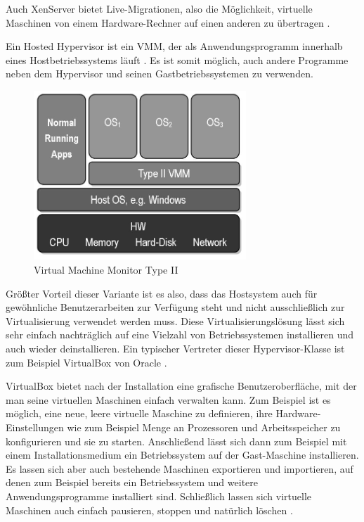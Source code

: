 Auch XenServer bietet Live-Migrationen, also die Möglichkeit, virtuelle Maschinen von einem Hardware-Rechner auf einen anderen zu übertragen \citep[Vgl.][]{xen:002}.


Ein Hosted Hypervisor ist ein \ac{VMM}, der als Anwendungsprogramm innerhalb eines Hostbetriebssystems läuft \citep[Vgl.][S. 22 ff.]{Goldberg73}. Es ist somit möglich, auch andere Programme neben dem Hypervisor und seinen Gastbetriebssystemen zu verwenden.

\begin{figure}[!ht]
  \begin{center}
    \includegraphics[width=8cm]{bilder/VMM-Type2.jpg}
    \caption{Virtual Machine Monitor Type II \citep{wiki:003}}
  \end{center}
\end{figure}

Größter Vorteil dieser Variante ist es also, dass das Hostsystem auch für gewöhnliche Benutzerarbeiten zur Verfügung steht und nicht ausschließlich zur Virtualisierung verwendet werden muss. Diese Virtualisierungslösung lässt sich sehr einfach nachträglich auf eine Vielzahl von Betriebssystemen installieren und auch wieder deinstallieren. Ein typischer Vertreter dieser Hypervisor-Klasse ist zum Beispiel VirtualBox von Oracle \citep[Vgl.][S. 24]{DamMohAnd12}.

VirtualBox bietet nach der Installation eine grafische Benutzeroberfläche, mit der man seine virtuellen Maschinen einfach verwalten kann. Zum Beispiel ist es möglich, eine neue, leere virtuelle Maschine zu definieren, ihre Hardware-Einstellungen wie zum Beispiel Menge an Prozessoren und Arbeitsspeicher zu konfigurieren und sie zu starten. Anschließend lässt sich dann zum Beispiel mit einem Installationsmedium ein Betriebssystem auf der Gast-Maschine installieren. Es lassen sich aber auch bestehende Maschinen exportieren und importieren, auf denen zum Beispiel bereits ein Betriebssystem und weitere Anwendungsprogramme installiert sind. Schließlich lassen sich virtuelle Maschinen auch einfach pausieren, stoppen und natürlich löschen \citep[Vgl.][S. 11 ff.]{Oracle14}.

